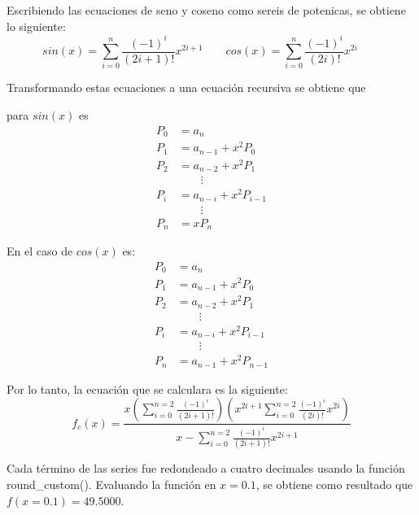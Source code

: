 Escribiendo las ecuaciones de seno y coseno como sereis de potenicas, se obtiene lo siguiente:
\begin{equation*}
    sin(x) = \sum_{i=0}^n \frac{(-1)^i}{(2i+1)!} x^{2i+1} \qquad
    cos(x) = \sum_{i=0}^n \frac{(-1)^i}{(2i)!} x^{2i} \qquad
\end{equation*}

Transformando estas ecuaciones a una ecuación recursiva se obtiene que

\begin{minipage}{0.45\linewidth}
    para $sin(x)$ es
    \begin{align*}
        P_0 & = a_n                  \\
        P_1 & = a_{n-1} + x^2P_0     \\
        P_2 & = a_{n-2} + x^2P_1     \\
            & \qquad\vdots           \\
        P_i & = a_{n-i} + x^2P_{i-1} \\
            & \qquad\vdots           \\
        P_n & = xP_n
    \end{align*}
\end{minipage}
\begin{minipage}{0.45\linewidth}
    En el caso de $cos(x)$ es:
    \begin{align*}
        P_0 & = a_n                  \\
        P_1 & = a_{n-1} + x^2P_0     \\
        P_2 & = a_{n-2} + x^2P_1     \\
            & \qquad\vdots           \\
        P_i & = a_{n-i} + x^2P_{i-1} \\
            & \qquad\vdots           \\
        P_n & = a_{n-1}+x^2P_{n-1}
    \end{align*}
\end{minipage}

Por lo tanto, la ecuación que se calculara es la siguiente:
\begin{equation}
    f_c(x) = \frac{x \left(\sum\limits_{i=0}^{n=2} \frac{(-1)^i}{(2i+1)!}\right) \left(x^{2i+1}\sum\limits_{i=0}^{n=2} \frac{(-1)^i}{(2i)!} x^{2i}\right)}{x-\sum\limits_{i=0}^{n=2} \frac{(-1)^i}{(2i+1)!} x^{2i+1}}
    \label{eq:problema_fc}
\end{equation}

Cada término de las series fue redondeado a cuatro decimales usando la función \textcolor{citecolor}{round\_custom()}.
Evaluando la función en $x=0.1$, se obtiene como resultado que $f(x=0.1)=49.5000$.